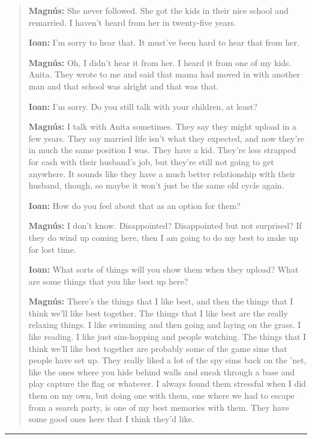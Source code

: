 \begin{quote}
\textbf{Magnús:} She never followed. She got the kids in their nice school and remarried. I haven't heard from her in twenty-five years.

\textbf{Ioan:} I'm sorry to hear that. It must've been hard to hear that from her.

\textbf{Magnús:} Oh, I didn't hear it from her. I heard it from one of my kids. Anita. They wrote to me and said that mama had moved in with another man and that school was alright and that was that.

\textbf{Ioan:} I'm sorry. Do you still talk with your children, at least?

\textbf{Magnús:} I talk with Anita sometimes. They say they might upload in a few years. They say married life isn't what they expected, and now they're in much the same position I was. They have a kid. They're less strapped for cash with their husband's job, but they're still not going to get anywhere. It sounds like they have a much better relationship with their husband, though, so maybe it won't just be the same old cycle again.

\textbf{Ioan:} How do you feel about that as an option for them?

\textbf{Magnús:} I don't know. Disappointed? Disappointed but not surprised? If they do wind up coming here, then I am going to do my best to make up for lost time.

\textbf{Ioan:} What sorts of things will you show them when they upload? What are some things that you like best up here?

\textbf{Magnús:} There's the things that I like best, and then the things that I think we'll like best together. The things that I like best are the really relaxing things. I like swimming and then going and laying on the grass. I like reading. I like just sim-hopping and people watching. The things that I think we'll like best together are probably some of the game sims that people have set up. They really liked a lot of the spy sims back on the 'net, like the ones where you hide behind walls and sneak through a base and play capture the flag or whatever. I always found them stressful when I did them on my own, but doing one with them, one where we had to escape from a search party, is one of my best memories with them. They have some good ones here that I think they'd like.
\end{quote}

\begin{center}\rule{0.5\linewidth}{0.5pt}\end{center}

